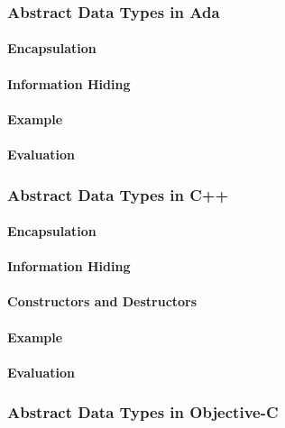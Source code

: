 \subsubsection{Abstract Data Types in Ada}\label{subsubsec:Abstract_Data_Types_Ada}
\paragraph{Encapsulation}\label{par:Ada_Encapsulation}
\paragraph{Information Hiding}\label{par:Ada_Info_Hiding}
\paragraph{Example}\label{par:Ada_Abstract_Data_Type_Example}
\paragraph{Evaluation}\label{par:Ada_Abstract_Data_Type_Evaluation}

\subsubsection{Abstract Data Types in C++}\label{subsubsec:Abstract_Data_Types_C++}
\paragraph{Encapsulation}\label{par:C++_Encapsulation}
\paragraph{Information Hiding}\label{par:C++_Info_Hiding}
\paragraph{Constructors and Destructors}\label{par:C++_Constructors_Destructors}
\paragraph{Example}\label{par:C++_Abstract_Data_Type_Example}
\paragraph{Evaluation}\label{par:C++_Abstract_Data_Type_Evaluation}

\subsubsection{Abstract Data Types in Objective-C}\label{subsubsec:Abstract_Data_Types_Objective_C}
